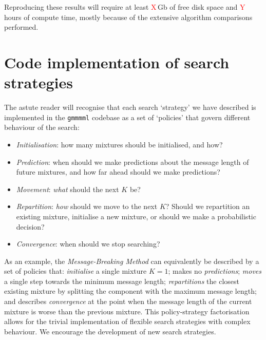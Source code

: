 \documentclass{elsarticle}
\newcommand{\todo}[1]{\textcolor{red}{#1}}
\begin{document}
Reproducing these results will require at least \todo{X}\,Gb of free disk space
and \todo{Y}\,hours of compute time, mostly because of the extensive algorithm 
comparisons performed.

\section{Code implementation of search strategies}

The astute reader will recognise that each search `strategy' we have described
is implemented in the \texttt{gmmmml} codebase as a set of `policies' that govern
different behaviour of the search:
\begin{itemize}
\item \emph{Initialisation}: how many mixtures should be initialised, and how?
\item \emph{Prediction}: when should we make predictions about the message length of future mixtures, and how far ahead should we make predictions?
\item \emph{Movement}: \emph{what} should the next $K$ be?
\item \emph{Repartition}: \emph{how} should we move to the next $K$? Should we repartition an existing mixture, initialise a new mixture, or should we make a probabilistic decision?
\item \emph{Convergence}: when should we stop searching?
\end{itemize}

As an example, the \emph{Message-Breaking Method} can equivalently be described
by a set of policies that: 
	\emph{initialise} a single mixture $K = 1$; 
	makes no \emph{predictions};
	\emph{moves} a single step towards the minimum message length;
	\emph{repartitions} the closest existing mixture by splitting the component with the maximum message length; and 
	describes \emph{convergence} at the point when the message length of the current mixture is worse than the previous mixture. 
This policy-strategy factorisation allows for the trivial implementation of flexible search strategies with complex behaviour. We encourage the development of new search strategies.

\end{document}
